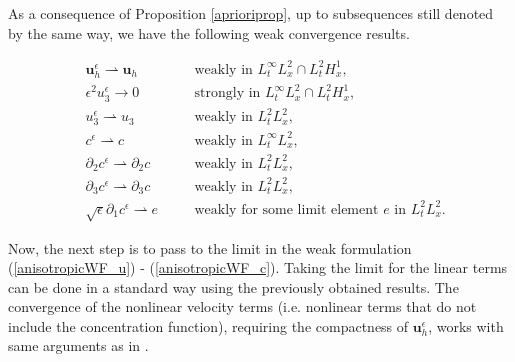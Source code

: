 \documentclass[11pt, a4paper]{article}
\begin{document}
As a consequence of Proposition \ref{aprioriprop}, up to subsequences still denoted by the same way, we have the following weak convergence results.

\begin{align} 
& \mathbf{u}_h^\epsilon \rightharpoonup \mathbf{u}_h &\quad & \text{weakly in $L_t^\infty L_x^2 \cap L_t^2 H_x^1$,} \label{WeakConvUHEps} \\
& \epsilon^2 u_3^\epsilon \to 0 &\quad & \text{strongly in $L_t^\infty L_x^2 \cap L_t^2 H_x^1$,} \label{WeakConvU3Eps} \\
& u_3^\epsilon \rightharpoonup u_3 &\quad & \text{weakly in $L_t^2 L_x^2$,} \label{WeakConvU3NoEps} \\
& c^\epsilon \rightharpoonup c &\quad & \text{weakly in $L_t^\infty L_x^2$,} \label{WeakConvCEps1} \\
& \partial_2 c^\epsilon \rightharpoonup \partial_2 c &\quad & \text{weakly in $L_t^2 L_x^2$,} \label{WeakConvCEps2} \\
& \partial_3 c^\epsilon \rightharpoonup \partial_3 c &\quad & \text{weakly in $L_t^2 L_x^2$,} \label{WeakConvCEps3} \\
& \sqrt{\epsilon} \partial_1 c^\epsilon \rightharpoonup e &\quad & \text{weakly for some limit element $e$ in $L_t^2 L_x^2$.} \label{WeakConvCEps4}
\end{align}

Now, the next step is to pass to the limit in the weak formulation (\ref{anisotropicWF_u}) - (\ref{anisotropicWF_c}). Taking the limit for the linear terms can be done in a standard way using the previously obtained results.
The convergence of the nonlinear velocity terms (i.e. nonlinear terms that do not include the concentration function), requiring the compactness of $\mathbf{u}_h^\epsilon$, 
works with same arguments as in \cite{pollatmws2019}. 
\end{document}
